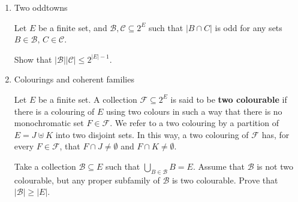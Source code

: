 \documentclass[kulak]{tplt}
\theoremstyle{definition}
\newcommand{\CC}{\mathcal C}
\newcommand{\BB}{\mathcal B}
\newcommand{\FF}{\mathcal F}
\begin{document}
\begin{enumerate}
\item Two oddtowns

Let $E$ be a finite set, and $\BB, \CC\subseteq 2^E$ such that $|B\cap C|$ is odd for any sets $B\in \BB, \, C \in \CC$.

Show that $|\BB| |\CC| \leq 2^{|E|-1}$.


\item Colourings and coherent families

Let $E$ be a finite set.
A collection $\FF \subseteq 2^E $ is said to be \textbf{two colourable} if there is a colouring of $E$ using two colours in such a way that there is no monochromatic set $F \in \FF$.
We refer to a two colouring by a partition of $E = J \uplus K$ into two disjoint sets.
In this way, a two colouring of $\FF$ has, for every $F \in \FF$, that $F\cap J \neq \emptyset $ and $ F \cap K \neq \emptyset $.

Take a collection $\BB \subseteq E$ such that $\bigcup_{B \in \BB} B = E$.
Assume that $\BB$ is not two colourable, but any proper subfamily of $\BB$ is two colourable.
Prove that $|\BB| \geq |E|$.



\end{enumerate}
\end{document}
